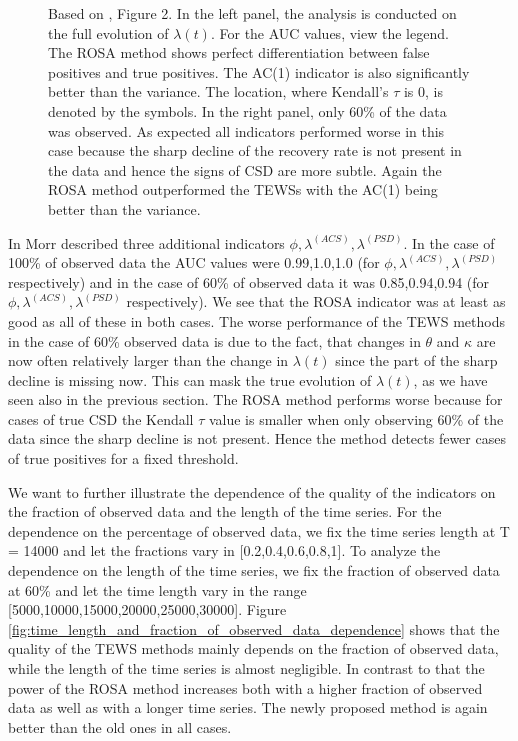 \documentclass[%
thesis=student,%
coverpage=false,%
titlepage=false,%
headmarks=true, %
english,%
font=libertine, %
math=newpxtx, %
BCOR=5mm,%
coverBCOR=11mm%
]{tumbook}
\begin{document}
\begin{figure}[h!]
    \caption{Based on \cite{Morr:2024}, Figure 2. In the left panel, the analysis is conducted on the full evolution of $\lambda(t)$. For the AUC values, view the legend. The ROSA method shows perfect differentiation between false positives and true positives. The AC(1) indicator is also significantly better than the variance. The location, where Kendall's $\tau$ is 0, is denoted by the symbols. In the right panel, only 60\% of the data was observed. As expected all indicators performed worse in this case because the sharp decline of the recovery rate is not present in the data and hence the signs of CSD are more subtle. Again the ROSA method outperformed the TEWSs with the AC(1) being better than the variance.}
    \label{fig:ROC_curves}
\end{figure}
 

In \cite{Morr:2024} Morr described three additional indicators $\phi,\lambda^{(ACS)},\lambda^{(PSD)}$. In the case of 100\% of observed data the AUC values were 0.99,1.0,1.0 (for $\phi,\lambda^{(ACS)},\lambda^{(PSD)}$ respectively) and in the case of 60\% of observed data it was 0.85,0.94,0.94 (for $\phi,\lambda^{(ACS)},\lambda^{(PSD)}$ respectively). We see that the ROSA indicator was at least as good as all of these in both cases.
The worse performance of the TEWS methods in the case of 60\% observed data is due to the fact, that changes in $\theta$ and $\kappa$ are now often relatively larger than the change in $\lambda(t)$ since the part of the sharp decline is missing now. This can mask the true evolution of $\lambda(t)$, as we have seen also in the previous section. The ROSA method performs worse because for cases of true CSD the Kendall $\tau$ value is smaller when only observing 60\% of the data since the sharp decline is not present. Hence the method detects fewer cases of true positives for a fixed threshold.

We want to further illustrate the dependence of the quality of the indicators on the fraction of observed data and the length of the time series. For the dependence on the percentage of observed data, we fix the time series length at T = 14000 and let the fractions vary in [0.2,0.4,0.6,0.8,1]. To analyze the dependence on the length of the time series, we fix the fraction of observed data at 60\% and let the time length vary in the range [5000,10000,15000,20000,25000,30000]. Figure \ref{fig:time_length_and_fraction_of_observed_data_dependence} shows that the quality of the TEWS methods mainly depends on the fraction of observed data, while the length of the time series is almost negligible. In contrast to that the power of the ROSA method increases both with a higher fraction of observed data as well as with a longer time series. The newly proposed method is again better than the old ones in all cases. 
\end{document}
